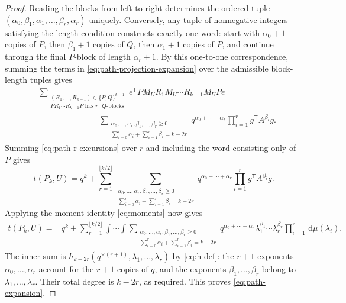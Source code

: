 \documentclass[11pt]{article}
\numberwithin{equation}{section}
\newcommand{\dd}{\,\mathrm d}
\newcommand{\tP}[2]{t(P_{#1},#2)}
\newcommand{\rep}[2]{#1^{\times #2}}
\begin{document}
\begin{proof}
  Reading the blocks from left to right determines the ordered tuple
  $(\alpha_0,\beta_1,\alpha_1,\ldots,\beta_r,\alpha_r)$ uniquely.
  Conversely, any tuple of nonnegative integers satisfying the length
  condition constructs exactly one word: start with $\alpha_0+1$ copies
  of $P$, then $\beta_1+1$ copies of $Q$, then $\alpha_1+1$ copies of $P$,
  and continue through the final $P$-block of length $\alpha_r+1$.
  By this one-to-one correspondence, summing the terms in
  \eqref{eq:path-projection-expansion} over the admissible block-length
  tuples gives
  \begin{equation}\label{eq:path-r-excursions}
    \begin{aligned}
      &\sum_{\substack{(R_1,\ldots,R_{k-1})\in\{P,Q\}^{k-1}\\
                       PR_1\cdots R_{k-1}P
                       \text{ has }r\text{ $Q$-blocks}}}
        e^{\mathsf T}P M_U R_1M_U\cdots R_{k-1}M_UPe\\
      &\qquad\qquad\qquad {}=
      \sum_{\substack{\alpha_0,\ldots,\alpha_r,\beta_1,\ldots,\beta_r\ge0\\
                      \sum_{i=0}^r\alpha_i+
                      \sum_{i=1}^r\beta_i=k-2r}}
      q^{\alpha_0+\cdots+\alpha_r}
      \prod_{i=1}^rg^{\mathsf T}A^{\beta_i}g.
    \end{aligned}
  \end{equation}
  Summing \eqref{eq:path-r-excursions} over $r$ and including the word
  consisting only of $P$ gives
  \[
    \tP kU=q^k+
    \sum_{r=1}^{\lfloor k/2\rfloor}
      \sum_{\substack{\alpha_0,\ldots,\alpha_r,\beta_1,\ldots,\beta_r\ge0\\
                      \sum_{i=0}^r\alpha_i+
                      \sum_{i=1}^r\beta_i=k-2r}}
      q^{\alpha_0+\cdots+\alpha_r}
      \prod_{i=1}^rg^{\mathsf T}A^{\beta_i}g.
  \]
  Applying the moment identity \eqref{eq:moments} now gives
  \[
    \begin{aligned}
      \tP kU={}&q^k+
      \sum_{r=1}^{\lfloor k/2\rfloor}
      \int\!\cdots\!\int
      \sum_{\substack{\alpha_0,\ldots,\alpha_r,\beta_1,\ldots,\beta_r\ge0\\
                      \sum_{i=0}^r\alpha_i+
                      \sum_{i=1}^r\beta_i=k-2r}}
      q^{\alpha_0+\cdots+\alpha_r}
      \lambda_1^{\beta_1}\cdots\lambda_r^{\beta_r}
      \prod_{i=1}^r\dd\mu(\lambda_i).
    \end{aligned}
  \]
  The inner sum is
  $h_{k-2r}(\rep q{(r+1)},\lambda_1,\ldots,\lambda_r)$ by
  \eqref{eq:h-def}: the $r+1$ exponents $\alpha_0,\ldots,\alpha_r$
  account for the $r+1$ copies of $q$, and the exponents
  $\beta_1,\ldots,\beta_r$ belong to $\lambda_1,\ldots,\lambda_r$.
  Their total degree is $k-2r$, as required.
  This proves \eqref{eq:path-expansion}.
\end{proof}
\end{document}

